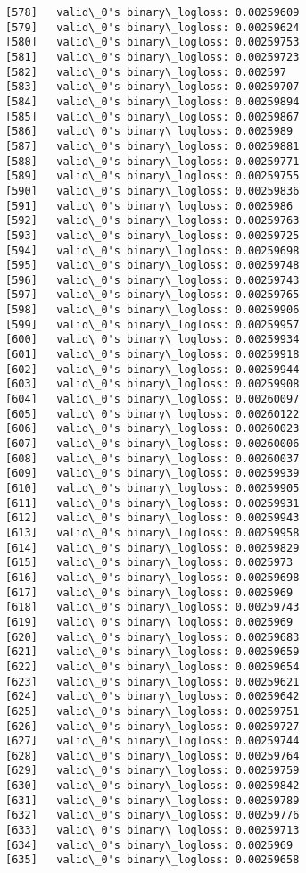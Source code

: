 \documentclass[11pt]{article}
\begin{document}
\begin{Verbatim}[commandchars=\\\{\}]
[578]	valid\_0's binary\_logloss: 0.00259609
[579]	valid\_0's binary\_logloss: 0.00259624
[580]	valid\_0's binary\_logloss: 0.00259753
[581]	valid\_0's binary\_logloss: 0.00259723
[582]	valid\_0's binary\_logloss: 0.002597
[583]	valid\_0's binary\_logloss: 0.00259707
[584]	valid\_0's binary\_logloss: 0.00259894
[585]	valid\_0's binary\_logloss: 0.00259867
[586]	valid\_0's binary\_logloss: 0.0025989
[587]	valid\_0's binary\_logloss: 0.00259881
[588]	valid\_0's binary\_logloss: 0.00259771
[589]	valid\_0's binary\_logloss: 0.00259755
[590]	valid\_0's binary\_logloss: 0.00259836
[591]	valid\_0's binary\_logloss: 0.0025986
[592]	valid\_0's binary\_logloss: 0.00259763
[593]	valid\_0's binary\_logloss: 0.00259725
[594]	valid\_0's binary\_logloss: 0.00259698
[595]	valid\_0's binary\_logloss: 0.00259748
[596]	valid\_0's binary\_logloss: 0.00259743
[597]	valid\_0's binary\_logloss: 0.00259765
[598]	valid\_0's binary\_logloss: 0.00259906
[599]	valid\_0's binary\_logloss: 0.00259957
[600]	valid\_0's binary\_logloss: 0.00259934
[601]	valid\_0's binary\_logloss: 0.00259918
[602]	valid\_0's binary\_logloss: 0.00259944
[603]	valid\_0's binary\_logloss: 0.00259908
[604]	valid\_0's binary\_logloss: 0.00260097
[605]	valid\_0's binary\_logloss: 0.00260122
[606]	valid\_0's binary\_logloss: 0.00260023
[607]	valid\_0's binary\_logloss: 0.00260006
[608]	valid\_0's binary\_logloss: 0.00260037
[609]	valid\_0's binary\_logloss: 0.00259939
[610]	valid\_0's binary\_logloss: 0.00259905
[611]	valid\_0's binary\_logloss: 0.00259931
[612]	valid\_0's binary\_logloss: 0.00259943
[613]	valid\_0's binary\_logloss: 0.00259958
[614]	valid\_0's binary\_logloss: 0.00259829
[615]	valid\_0's binary\_logloss: 0.0025973
[616]	valid\_0's binary\_logloss: 0.00259698
[617]	valid\_0's binary\_logloss: 0.0025969
[618]	valid\_0's binary\_logloss: 0.00259743
[619]	valid\_0's binary\_logloss: 0.0025969
[620]	valid\_0's binary\_logloss: 0.00259683
[621]	valid\_0's binary\_logloss: 0.00259659
[622]	valid\_0's binary\_logloss: 0.00259654
[623]	valid\_0's binary\_logloss: 0.00259621
[624]	valid\_0's binary\_logloss: 0.00259642
[625]	valid\_0's binary\_logloss: 0.00259751
[626]	valid\_0's binary\_logloss: 0.00259727
[627]	valid\_0's binary\_logloss: 0.00259744
[628]	valid\_0's binary\_logloss: 0.00259764
[629]	valid\_0's binary\_logloss: 0.00259759
[630]	valid\_0's binary\_logloss: 0.00259842
[631]	valid\_0's binary\_logloss: 0.00259789
[632]	valid\_0's binary\_logloss: 0.00259776
[633]	valid\_0's binary\_logloss: 0.00259713
[634]	valid\_0's binary\_logloss: 0.0025969
[635]	valid\_0's binary\_logloss: 0.00259658

\end{Verbatim}
\end{document}
